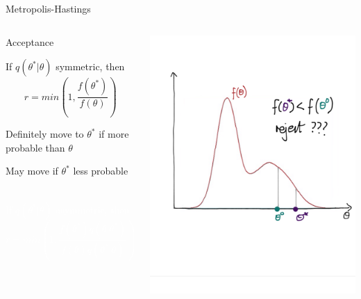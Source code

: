 \documentclass[compress]{beamer}
\begin{document}
\begin{frame}[label=sec-7-7]{Metropolis-Hastings}
\begin{columns}[c] 
\begin{block}{Acceptance}
\begin{itemize}
\item If $q(\theta^*|\theta)$ symmetric, then 
$$ r = min \left( 1,\dfrac{f(\theta^*)}{f(\theta)} \right)$$ 
\item Definitely move to $\theta^*$ if more probable than $\theta$ 
\item May move if $\theta^*$ less probable \\~\\
\textcolor{white}{
\item[\color{white}] If $q(\theta^*|\theta)$ asymmetric, then $$ r = min \left( 1,\dfrac{f(\theta^*)q(\theta|\theta^*)}{f(\theta)q(\theta^*|\theta)} \right)$$
}
\end{itemize}
\end{block}

\includegraphics[width=1\linewidth]{MH4}
\end{columns}
\end{frame}
\end{document}
